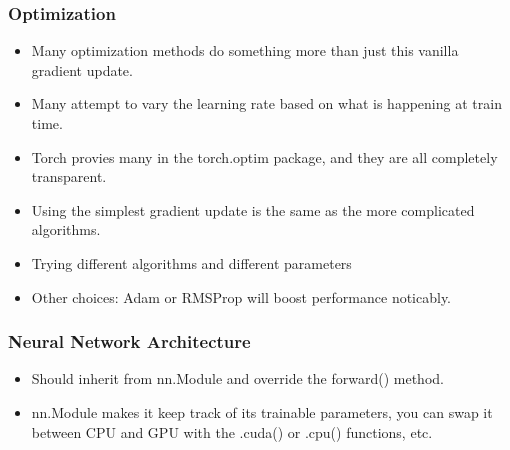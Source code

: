 \begin{frame}[fragile]
\frametitle{Optimization}

\begin{itemize}
\item Many optimization methods do something more than just this vanilla gradient update.
\item Many attempt to vary the learning rate based on what is happening at train time. 
\item Torch provies many in the torch.optim package, and they are all completely transparent. 
\item Using the simplest gradient update is the same as the more complicated algorithms. 
\item Trying different algorithms and different parameters 
\item Other choices: Adam or RMSProp will boost performance noticably.
\end{itemize}

\end{frame} 

\begin{frame}[fragile]
\frametitle{Neural Network Architecture}

\begin{itemize}
\item Should inherit from nn.Module and override the forward() method.
\item  nn.Module makes it keep track of its trainable parameters, you can swap it between CPU and GPU with the .cuda() or .cpu() functions, etc.
\end{itemize}

\end{frame} 






